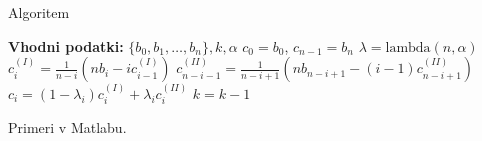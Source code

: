 \documentclass{beamer}
\begin{document}
\begin{frame}{Algoritem}
    \begin{algorithm}[H]
      \begin{algorithmic}[1]
      \STATE \textbf{Vhodni podatki:} $\{b_0, b_1, \ldots, b_n\}, k, \alpha$
      \STATE $c_0 = b_0$, $c_{n-1} = b_n$
      \STATE $\lambda = \text{lambda}(n, \alpha)$
              \STATE $c_i^{(I)} = \frac{1}{n-i}\left(n b_i - i c_{i-1}^{(I)}\right)$
              \STATE $c_{n-i-1}^{(II)} = \frac{1}{n-i+1}\left(n b_{n-i+1} - (i - 1) c_{n-i+1}^{(II)}\right)$
          \ENDFOR
              \STATE $c_i = (1 - \lambda_i)c_i^{(I)} + \lambda_i c_i^{(II)}$
          \ENDFOR
          \STATE $k = k - 1$
      \ENDWHILE
      \end{algorithmic}
      \caption{Algoritem za znižanje stopnje Bézierjeve krivulje}
      \label{alg:bez}
      \end{algorithm}
      
  
\end{frame}




\begin{frame}
  Primeri v Matlabu.
\end{frame}
\end{document}

